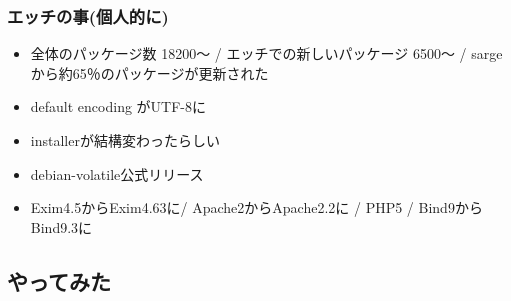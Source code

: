 \documentclass[mingoth,a4paper]{jsarticle}
\begin{document}
\subsubsection {エッチの事(個人的に)}
\begin{itemize}
\item 全体のパッケージ数 18200〜 / エッチでの新しいパッケージ 6500〜 / sargeから約65％のパッケージが更新された
\item default encoding がUTF-8に
\item installerが結構変わったらしい
\item debian-volatile公式リリース
\item Exim4.5からExim4.63に/ Apache2からApache2.2に / PHP5 / Bind9からBind9.3に
\end{itemize}
\subsection{やってみた}
\end{document}
